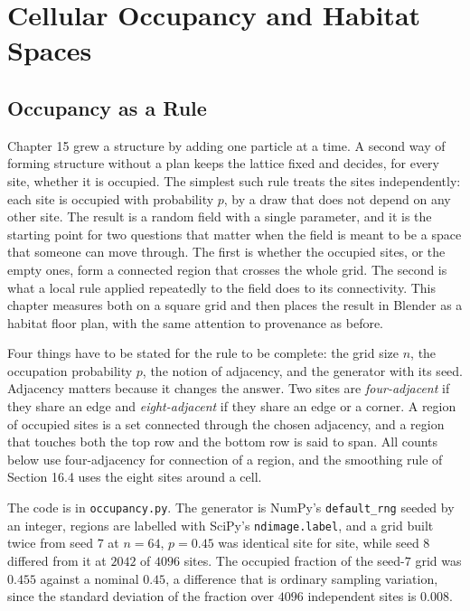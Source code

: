 \chapter{Cellular Occupancy and Habitat Spaces}

\section{Occupancy as a Rule}

Chapter 15 grew a structure by adding one particle at a time. A second way of forming structure without a plan keeps the lattice fixed and decides, for every site, whether it is occupied. The simplest such rule treats the sites independently: each site is occupied with probability $p$, by a draw that does not depend on any other site. The result is a random field with a single parameter, and it is the starting point for two questions that matter when the field is meant to be a space that someone can move through. The first is whether the occupied sites, or the empty ones, form a connected region that crosses the whole grid. The second is what a local rule applied repeatedly to the field does to its connectivity. This chapter measures both on a square grid and then places the result in Blender as a habitat floor plan, with the same attention to provenance as before.

Four things have to be stated for the rule to be complete: the grid size $n$, the occupation probability $p$, the notion of adjacency, and the generator with its seed. Adjacency matters because it changes the answer. Two sites are \emph{four-adjacent} if they share an edge and \emph{eight-adjacent} if they share an edge or a corner. A region of occupied sites is a set connected through the chosen adjacency, and a region that touches both the top row and the bottom row is said to span. All counts below use four-adjacency for connection of a region, and the smoothing rule of Section 16.4 uses the eight sites around a cell.

The code is in \texttt{occupancy.py}. The generator is NumPy's \texttt{default\_rng} seeded by an integer, regions are labelled with SciPy's \texttt{ndimage.label}, and a grid built twice from seed $7$ at $n=64$, $p=0.45$ was identical site for site, while seed $8$ differed from it at $2042$ of $4096$ sites. The occupied fraction of the seed-$7$ grid was $0.455$ against a nominal $0.45$, a difference that is ordinary sampling variation, since the standard deviation of the fraction over $4096$ independent sites is $0.008$.

